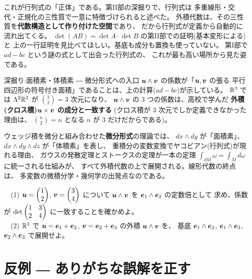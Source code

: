これが行列式の「正体」である。第II部の深掘りで、行列式は
多重線形・交代・正規化の三性質で一意に特徴づけられると述べた。
外積代数は、その三性質を\textbf{代数構造として作り付けた空間}であり、
だから行列式が定義から自動的に流れ出てくる。
$\det(AB) = \det A \cdot \det B$ の第II部での証明(基本変形による)と
上の一行証明を見比べてほしい。基底も成分も置換も使っていない。
第I部で $ad - bc$ という謎の式として出会った行列式の、
これが最も高い場所から見た姿である。

\begin{itembox}[l]{深掘り:面積素・体積素 ― 微分形式への入口}
$\bm{u} \wedge \bm{v}$ の係数が「$\bm{u}, \bm{v}$ の張る
平行四辺形の符号付き面積」であることは、上の計算($ad - bc$)が示している。
$\mathbb{R}^3$ では $\Lambda^2 \mathbb{R}^3$ が $\binom{3}{2} = 3$ 次元になり、
$\bm{u} \wedge \bm{v}$ の $3$ つの係数は、高校で学んだ
\textbf{外積(クロス積)$\bm{u} \times \bm{v}$ の成分と一致する}
(クロス積が $3$ 次元でしか定義できなかった理由は、
$\binom{n}{2} = n$ となる $n$ が $3$ だけだからである)。

ウェッジ積を微分と組み合わせた\textbf{微分形式}の理論では、
$dx \wedge dy$ が「面積素」、$dx \wedge dy \wedge dz$ が「体積素」を表し、
重積分の変数変換でヤコビアン(行列式)が現れる理由、
ガウスの発散定理とストークスの定理が一本の定理
$\int_{\partial M} \omega = \int_M d\omega$ に統一される仕組みが、
すべて外積代数の上で展開される。線形代数の終点は、
多変数の微積分学・幾何学の出発点なのである。
\end{itembox}

\begin{mondai}\label{q:wedge}
　(1) $\bm{u} = \begin{pmatrix}1 \\ 2\end{pmatrix}$, $\bm{v} = \begin{pmatrix}3 \\ 4\end{pmatrix}$ について
$\bm{u} \wedge \bm{v}$ を $\bm{e}_1 \wedge \bm{e}_2$ の定数倍として
求め、係数が $\det\begin{pmatrix}1 & 3 \\ 2 & 4\end{pmatrix}$ に一致することを確かめよ。\\
　(2) $\mathbb{R}^3$ で $\bm{u} = \bm{e}_1 + \bm{e}_2$,
$\bm{v} = \bm{e}_2 + \bm{e}_3$ の外積 $\bm{u} \wedge \bm{v}$ を、
基底 $\bm{e}_1 \wedge \bm{e}_2$, $\bm{e}_1 \wedge \bm{e}_3$,
$\bm{e}_2 \wedge \bm{e}_3$ で展開せよ。
\end{mondai}

\section{反例 ― ありがちな誤解を正す}

